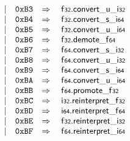 $$\begin{array}[t]{@{}lrrl@{}l@{}l@{}l@{}}
& & | & \mathtt{0xB3} & \quad\Rightarrow\quad{} & \mathsf{f{\scriptstyle 32}} {.} {{\mathsf{convert}}{\mathsf{\_}}{\mathsf{u}}}{\mathsf{\_}}{\mathsf{i{\scriptstyle 32}}} \\
& & | & \mathtt{0xB4} & \quad\Rightarrow\quad{} & \mathsf{f{\scriptstyle 32}} {.} {{\mathsf{convert}}{\mathsf{\_}}{\mathsf{s}}}{\mathsf{\_}}{\mathsf{i{\scriptstyle 64}}} \\
& & | & \mathtt{0xB5} & \quad\Rightarrow\quad{} & \mathsf{f{\scriptstyle 32}} {.} {{\mathsf{convert}}{\mathsf{\_}}{\mathsf{u}}}{\mathsf{\_}}{\mathsf{i{\scriptstyle 64}}} \\
& & | & \mathtt{0xB6} & \quad\Rightarrow\quad{} & \mathsf{f{\scriptstyle 32}} {.} {\mathsf{demote}}{\mathsf{\_}}{\mathsf{f{\scriptstyle 64}}} \\
& & | & \mathtt{0xB7} & \quad\Rightarrow\quad{} & \mathsf{f{\scriptstyle 64}} {.} {{\mathsf{convert}}{\mathsf{\_}}{\mathsf{s}}}{\mathsf{\_}}{\mathsf{i{\scriptstyle 32}}} \\
& & | & \mathtt{0xB8} & \quad\Rightarrow\quad{} & \mathsf{f{\scriptstyle 64}} {.} {{\mathsf{convert}}{\mathsf{\_}}{\mathsf{u}}}{\mathsf{\_}}{\mathsf{i{\scriptstyle 32}}} \\
& & | & \mathtt{0xB9} & \quad\Rightarrow\quad{} & \mathsf{f{\scriptstyle 64}} {.} {{\mathsf{convert}}{\mathsf{\_}}{\mathsf{s}}}{\mathsf{\_}}{\mathsf{i{\scriptstyle 64}}} \\
& & | & \mathtt{0xBA} & \quad\Rightarrow\quad{} & \mathsf{f{\scriptstyle 64}} {.} {{\mathsf{convert}}{\mathsf{\_}}{\mathsf{u}}}{\mathsf{\_}}{\mathsf{i{\scriptstyle 64}}} \\
& & | & \mathtt{0xBB} & \quad\Rightarrow\quad{} & \mathsf{f{\scriptstyle 64}} {.} {\mathsf{promote}}{\mathsf{\_}}{\mathsf{f{\scriptstyle 32}}} \\
& & | & \mathtt{0xBC} & \quad\Rightarrow\quad{} & \mathsf{i{\scriptstyle 32}} {.} {\mathsf{reinterpret}}{\mathsf{\_}}{\mathsf{f{\scriptstyle 32}}} \\
& & | & \mathtt{0xBD} & \quad\Rightarrow\quad{} & \mathsf{i{\scriptstyle 64}} {.} {\mathsf{reinterpret}}{\mathsf{\_}}{\mathsf{f{\scriptstyle 64}}} \\
& & | & \mathtt{0xBE} & \quad\Rightarrow\quad{} & \mathsf{f{\scriptstyle 32}} {.} {\mathsf{reinterpret}}{\mathsf{\_}}{\mathsf{i{\scriptstyle 32}}} \\
& & | & \mathtt{0xBF} & \quad\Rightarrow\quad{} & \mathsf{f{\scriptstyle 64}} {.} {\mathsf{reinterpret}}{\mathsf{\_}}{\mathsf{i{\scriptstyle 64}}} \\

\end{array}$$
